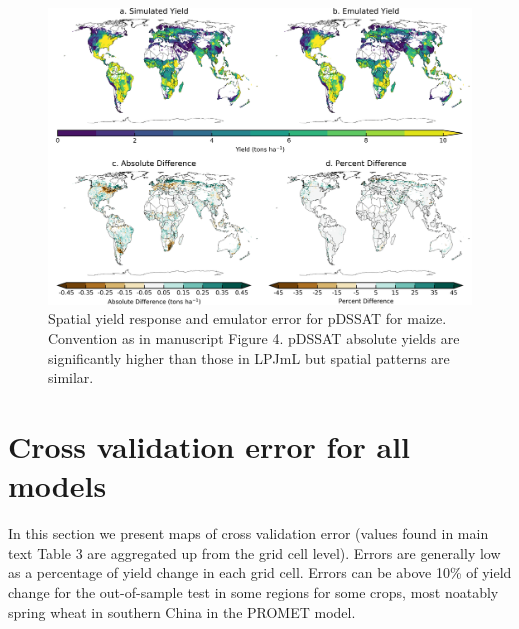 \documentclass[12pt]{article}
\begin{document}
\begin{figure}[h!]
  \includegraphics[width=\textwidth]{pdssat_maize.png}
  \caption{Spatial yield response and emulator error for pDSSAT for maize. Convention as in manuscript Figure 4. pDSSAT absolute yields are significantly higher than those in LPJmL but spatial patterns are similar.}
  \label{fig:lpjmlrice}
\end{figure}




\clearpage
\section{Cross validation error for all models}
\begin{flushleft}
In this section we present maps of cross validation error (values found in main text Table 3 are aggregated up from the grid cell level). Errors are generally low as a percentage of yield change in each grid cell. Errors can be above 10\% of yield change for the out-of-sample test in some regions for some crops, most noatably spring wheat in southern China in the PROMET model.
\end{flushleft}
\end{document}
